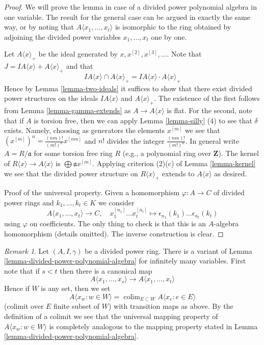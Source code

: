 \documentclass{stacks-project}
\theoremstyle{plain}
\theoremstyle{definition}
\theoremstyle{remark}
\newtheorem{remark}[subsection]{Remark}
\numberwithin{equation}{subsection}
\def\colim{\mathop{\mathrm{colim}}\nolimits}
\begin{document}
\begin{proof}
We will prove the lemma in case of a divided power polynomial algebra
in one variable. The result for the general case can be argued in exactly
the same way, or by noting that $A\langle x_1, \ldots, x_t\rangle$ is
isomorphic to the ring obtained by adjoining the divided power variables
$x_1, \ldots, x_t$ one by one.

\medskip\noindent
Let $A\langle x \rangle_{+}$ be the ideal generated by
$x, x^{[2]}, x^{[3]}, \ldots$.
Note that $J = IA\langle x \rangle + A\langle x \rangle_{+}$
and that
$$
IA\langle x \rangle \cap A\langle x \rangle_{+} =
IA\langle x \rangle \cdot A\langle x \rangle_{+}
$$
Hence by Lemma \ref{lemma-two-ideals} it suffices to show that there
exist divided power structures on the ideals $IA\langle x \rangle$ and
$A\langle x \rangle_{+}$. The existence of the first follows from
Lemma \ref{lemma-gamma-extends} as $A \to A\langle x \rangle$ is flat.
For the second, note that if $A$ is torsion free, then we can apply
Lemma \ref{lemma-silly} (4) to see that $\delta$ exists. Namely, choosing
as generators the elements $x^{[m]}$ we see that
$(x^{[m]})^n = \frac{(nm)!}{(m!)^n} x^{[nm]}$
and $n!$ divides the integer $\frac{(nm)!}{(m!)^n}$.
In general write $A = R/\mathfrak a$ for some torsion free ring $R$
(e.g., a polynomial ring over $\mathbf{Z}$). The kernel of
$R\langle x \rangle \to A\langle x \rangle$ is
$\bigoplus \mathfrak a x^{[m]}$. Applying criterion (2)(c) of
Lemma \ref{lemma-kernel} we see that the divided power structure
on $R\langle x \rangle_{+}$ extends to $A\langle x \rangle$ as
desired.

\medskip\noindent
Proof of the universal property. Given a homomorphism $\varphi : A \to C$
of divided power rings and $k_1, \ldots, k_t \in K$ we consider
$$
A\langle x_1, \ldots, x_t \rangle \to C,\quad
x_1^{[n_1]} \ldots x_t^{[n_t]} \longmapsto
\epsilon_{n_1}(k_1) \ldots \epsilon_{n_t}(k_t)
$$
using $\varphi$ on coefficients. The only thing to check is that
this is an $A$-algebra homomorphism (details omitted). The inverse
construction is clear.
\end{proof}

\begin{remark}
\label{remark-divided-power-polynomial-algebra}
Let $(A, I, \gamma)$ be a divided power ring.
There is a variant of Lemma \ref{lemma-divided-power-polynomial-algebra}
for infinitely many variables. First note that if $s < t$ then there
is a canonical map
$$
A\langle x_1, \ldots, x_s \rangle \to A\langle x_1, \ldots, x_t\rangle
$$
Hence if $W$ is any set, then we set
$$
A\langle x_w: w \in W\rangle =
\colim_{E \subset W} A\langle x_e:e \in E\rangle
$$
(colimit over $E$ finite subset of $W$)
with transition maps as above. By the definition of a colimit we see
that the universal mapping property of $A\langle x_w: w \in W\rangle$ is
completely analogous to the mapping property stated in
Lemma \ref{lemma-divided-power-polynomial-algebra}.
\end{remark}
\end{document}
